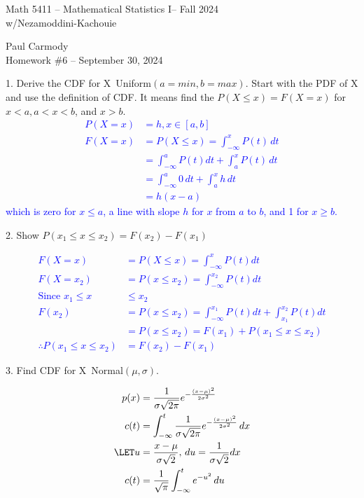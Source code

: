 \documentclass[10pt,a4paper]{report}
\newcommand{\CLASSNAME}{Math 5411 -- Mathematical Statistics I}
\newcommand{\PROFESSOR}{Nezamoddini-Kachouie}
\newcommand{\STUDENTNAME}{Paul Carmody}
\newcommand{\ASSIGNMENT}{Homework \#6 }
\newcommand{\DUEDATE}{September 30, 2024}
\newcommand{\SEMESTER}{Fall 2024}
\newcommand{\BLUE}[1]{\textcolor{blue}{#1}}
\begin{document}
\begin{center}
	\Large{\CLASSNAME -- \SEMESTER} \\
	\large{w/\PROFESSOR}
\end{center}
\begin{center}
	\STUDENTNAME \\
	\ASSIGNMENT -- \DUEDATE\\
\end{center}

1. Derive the CDF for X~Uniform$(a=min, b=max)$. Start with the PDF of X and use the definition of CDF.
It means find the $P(X \le x) = F(X=x)$ for $x < a, a < x < b$, and $x > b$.
\BLUE{
\begin{align*}
	P(X=x) &= h, x \in [a,b]\\
	F(X=x) &= P(X \le x) = \int_{-\infty}^x P(t) \, dt\\
		&= \int_{-\infty}^a P(t) dt + \int_a^x P(t)\, dt\\
		&= \int_{-\infty}^a 0\, dt + \int_a^x h\, dt\\
		&= h(x-a)
\end{align*}which is zero for $x \le a$, a line with slope $h$ for $x$ from $a$ to $b$, and 1 for $x \ge b$.\\}

2. Show $P(x_1 \le x \le x_2) = F(x_2) - F(x_1)$

\BLUE{\begin{align*}
	F(X=x) &= P(X \le x) = \int_{-\infty}^x P(t) dt\\
	F(X=x_2) &= P(x \le x_2) = \int_{-\infty}^{x_2} P(t) dt\\
	\text{Since } x_1 \le x &\le x_2 \\
	F(x_2) &= P(x \le x_2) = \int_{-\infty}^{x_1} P(t) dt + \int_{x_1}^{x_2} P(t) dt\\	
		&= P(x \le x_2) = F(x_1) + P(x_1 \le x \le x_2)\\	
	\therefore P(x_1 \le x \le x_2) &= F(x_2) - F(x_1)
\end{align*} }

3. Find CDF for X~Normal$(\mu, \sigma)$. 

\BLUE{\begin{align*}
	p(x) &= \frac{1}{\sigma\sqrt{2\pi}}e^{-\frac{(x-\mu)^2}{2\sigma^2}} \\
	c(t) &= \int_{-\infty}^t \frac{1}{\sigma\sqrt{2\pi}}e^{-\frac{(x-\mu)^2}{2\sigma^2}}\, dx \\
	\LET u &= \frac{x-\mu}{\sigma\sqrt{2}},\, du = \frac{1}{\sigma\sqrt{2}} dx \\
	c(t) &= \frac{1}{\sqrt{\pi}} \int_{-\infty}^t e^{-u^2} \,du
\end{align*} }
\end{document}

